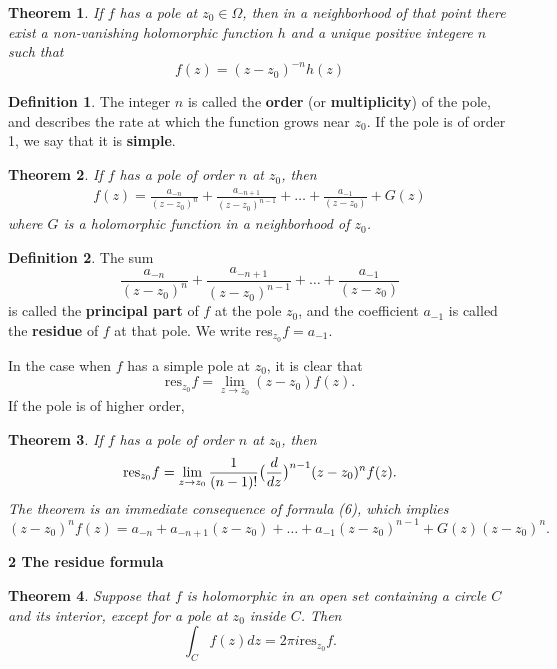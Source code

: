 \documentclass{article}
\newtheorem{theorem}{Theorem}
\theoremstyle{definition}
\newtheorem{definition}{Definition}[section]
\theoremstyle{remark}
\begin{document}
    \begin{theorem}
        If $f$ has a pole at $z_0\in\Omega$, then in a neighborhood of that point there exist a non-vanishing holomorphic function
        $h$ and a unique positive integere $n$ such that
        \[ f(z) = (z-z_0)^{-n}h(z) \]
    \end{theorem}

    \begin{definition}
        The integer $n$ is called the \textbf{order} (or \textbf{multiplicity}) of the pole, and describes the rate at which the
        function grows near $z_0$. If the pole is of order 1, we say that it is \textbf{simple}.
    \end{definition}

    \begin{theorem}
        If $f$ has a pole of order $n$ at $z_0$, then
        \begin{align}
            f(z) = \frac{a_{-n}}{(z-z_0)^n} + \frac{a_{-n+1}}{(z-z_0)^{n-1}} + \hdots + \frac{a_{-1}}{(z-z_0)} + G(z)
        \end{align}
        where $G$ is a holomorphic function in a neighborhood of $z_0$.
    \end{theorem}

    \begin{definition}
        The sum
        \[ \frac{a_{-n}}{(z-z_0)^n} + \frac{a_{-n+1}}{(z-z_0)^{n-1}} + \hdots + \frac{a_{-1}}{(z-z_0)} \]
        is called the \textbf{principal part} of $f$ at the pole $z_0$, and the coefficient $a_{-1}$ is called the \textbf{residue}
        of $f$ at that pole. We write res$_{z_0}f = a_{-1}$.
    \end{definition}

    In the case when $f$ has a simple pole at $z_0$, it is clear that
    \[ \text{res}_{z_0}f = \lim_{z\to z_0} (z-z_0)f(z). \]
    If the pole is of higher order, 
    \begin{theorem}
        If $f$ has a pole of order $n$ at $z_0$, then
        \[ \text{res}_{z_0}f = \lim_{z\to z_0} \frac{1}{(n-1)!}\big{(}\frac{d}{dz}\big{)}^{n-1}(z-z_0)^nf(z). \]
        The theorem is an immediate consequence of formula (6), which implies
        \[ (z-z_0)^nf(z) = a_{-n}+a_{-n+1}(z-z_0) + \hdots + a_{-1}(z-z_0)^{n-1} + G(z)(z-z_0)^n. \]
    \end{theorem}

    \newpage

    \textbf{2 The residue formula}

    \begin{theorem}
        Suppose that $f$ is holomorphic in an open set containing a circle $C$ and its interior, except for a pole at $z_0$ inside
        $C$. Then
        \[ \int_C f(z)dz = 2\pi i \text{res}_{z_0}f. \]
    \end{theorem}
\end{document}
